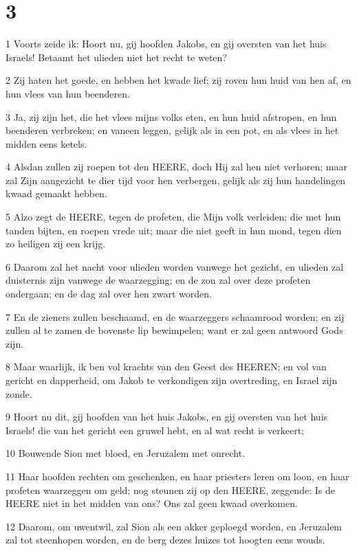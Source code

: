 \chapter{3}

\par 1 Voorts zeide ik: Hoort nu, gij hoofden Jakobs, en gij oversten van het huis Israels! Betaamt het ulieden niet het recht te weten?
\par 2 Zij haten het goede, en hebben het kwade lief; zij roven hun huid van hen af, en hun vlees van hun beenderen.
\par 3 Ja, zij zijn het, die het vlees mijns volks eten, en hun huid afstropen, en hun beenderen verbreken; en vaneen leggen, gelijk als in een pot, en als vlees in het midden eens ketels.
\par 4 Alsdan zullen zij roepen tot den HEERE, doch Hij zal hen niet verhoren; maar zal Zijn aangezicht te dier tijd voor hen verbergen, gelijk als zij hun handelingen kwaad gemaakt hebben.
\par 5 Alzo zegt de HEERE, tegen de profeten, die Mijn volk verleiden; die met hun tanden bijten, en roepen vrede uit; maar die niet geeft in hun mond, tegen dien zo heiligen zij een krijg.
\par 6 Daarom zal het nacht voor ulieden worden vanwege het gezicht, en ulieden zal duisternis zijn vanwege de waarzegging; en de zon zal over deze profeten ondergaan; en de dag zal over hen zwart worden.
\par 7 En de zieners zullen beschaamd, en de waarzeggers schaamrood worden; en zij zullen al te zamen de bovenste lip bewimpelen; want er zal geen antwoord Gods zijn.
\par 8 Maar waarlijk, ik ben vol krachts van den Geest des HEEREN; en vol van gericht en dapperheid, om Jakob te verkondigen zijn overtreding, en Israel zijn zonde.
\par 9 Hoort nu dit, gij hoofden van het huis Jakobs, en gij oversten van het huis Israels! die van het gericht een gruwel hebt, en al wat recht is verkeert;
\par 10 Bouwende Sion met bloed, en Jeruzalem met onrecht.
\par 11 Haar hoofden rechten om geschenken, en haar priesters leren om loon, en haar profeten waarzeggen om geld; nog steunen zij op den HEERE, zeggende: Is de HEERE niet in het midden van ons? Ons zal geen kwaad overkomen.
\par 12 Daarom, om uwentwil, zal Sion als een akker geploegd worden, en Jeruzalem zal tot steenhopen worden, en de berg dezes huizes tot hoogten eens wouds.

